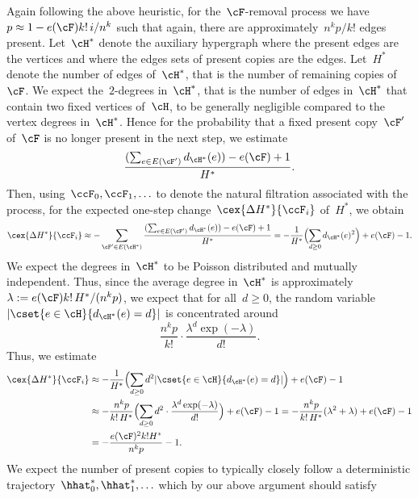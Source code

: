 \documentclass[11pt]{amsart}
\DeclarePairedDelimiter{\paren}{\lparen}{\rparen}
\DeclarePairedDelimiter{\abs}{\lvert}{\rvert}
\theoremstyle{definition}
\numberwithin{equation}{section}
\begin{document}
	

	Again following the above heuristic, for the~$\cF$-removal process we have~$p\approx 1-e(\cF)k!\, i/n^k$ such that again, there are approximately~$n^kp/k!$ edges present.
	Let~$\cH^*$ denote the auxiliary hypergraph where the present edges are the vertices and where the edges sets of present copies are the edges.
	Let~$H^*$ denote the number of edges of~$\cH^*$, that is the number of remaining copies of~$\cF$.
	We expect the~$2$-degrees in~$\cH^*$, that is the number of edges in~$\cH^*$ that contain two fixed vertices of~$\cH$, to be generally negligible compared to the vertex degrees in~$\cH^*$.
	Hence for the probability that a fixed present copy~$\cF'$ of~$\cF$ is no longer present in the next step, we estimate
	\begin{equation*}
		\frac{(\sum_{e\in E(\cF')} d_{\cH^*}(e))-e(\cF)+1}{H^*}.
	\end{equation*}
	Then, using~$\ccF_0,\ccF_1,\ldots$ to denote the natural filtration associated with the process, for the expected one-step change~$\cex{\Delta H^*}{\ccF_i}$ of~$H^*$, we obtain
	\begin{equation*}
		\cex{\Delta H^*}{\ccF_i}\approx-\sum_{\cF'\in E(\cH^*)}\frac{(\sum_{e\in E(\cF')} d_{\cH^*}(e))-e(\cF)+1}{H^*}
		=-\frac{1}{H^*}\paren[\Big]{ \sum_{d\geq 0} d_{\cH^*}(e)^2}+e(\cF)-1.
	\end{equation*}
	We expect the degrees in~$\cH^*$ to be Poisson distributed and mutually independent.
	Thus, since the average degree in~$\cH^*$ is approximately~$\lambda:=e(\cF)k!\,H^*/(n^k p)$, we expect that for all~$d\geq 0$, the random variable~$\abs{\cset{ e\in\cH }{ d_{\cH^*}(e)=d }}$ is concentrated around
	\begin{equation*}
		\frac{n^kp}{k!}\cdot \frac{\lambda^d \exp(-\lambda)}{d!}.
	\end{equation*} 
	Thus, we estimate
	\begin{equation*}
		\begin{aligned}
			\cex{\Delta H^*}{\ccF_i}&\approx-\frac{1}{H^*}\paren[\Big]{ \sum_{d\geq 0} d^2\abs{\cset{ e\in\cH }{ d_{\cH^*}(e)=d }} }+e(\cF)-1\\
			&\approx-\frac{n^kp}{k!\, H^*}\paren[\Big]{ \sum_{d\geq 0} d^2\cdot \frac{\lambda^d \exp(-\lambda)}{d!} }+e(\cF)-1
			=-\frac{n^kp}{k!\, H^*}(\lambda^2+\lambda)+e(\cF)-1\\
			&=-\frac{e(\cF)^2k! H^*}{n^k p}-1.
		\end{aligned}
	\end{equation*}
	We expect the number of present copies to typically closely follow a deterministic trajectory~$\hhat^*_0,\hhat^*_1,\ldots$ which by our above argument should satisfy
\end{document}
